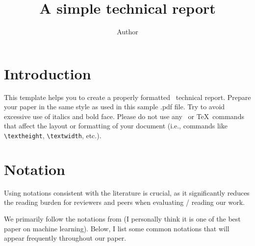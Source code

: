 \documentclass[report]{imsart}
\theoremstyle{plain}
\theoremstyle{definition}
\begin{document}
\begin{frontmatter}
\title{A simple technical report}

\begin{aug}
\author[A]{Author}
\address[A]{Department of Statistics, The Chinese University of Hong Kong }
\end{aug}


\end{frontmatter}

\section{Introduction}

This template helps you to create a properly formatted \LaTeXe\ technical report.
Prepare your paper in the same style as used in this sample .pdf file.
Try to avoid excessive use of italics and bold face.
Please do not use any \LaTeXe\ or \TeX\ commands that affect the layout
or formatting of your document (i.e., commands like \verb|\textheight|,
\verb|\textwidth|, etc.).

\section{Notation}

Using notations consistent with the literature is crucial, as it significantly reduces the reading burden for reviewers and peers when evaluating / reading our work.

We primarily follow the notations from \cite{bartlett2006convexity} (I personally think it is one of the best paper on machine learning). Below, I list some common notations that will appear frequently throughout our paper.
\end{document}
